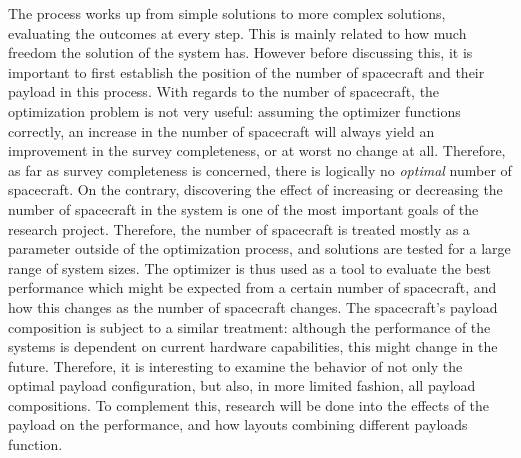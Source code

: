 The process works up from simple solutions to more complex solutions, evaluating the outcomes at every step. This is mainly related to how much freedom the solution of the system has. However before discussing this, it is important to first establish the position of the number of spacecraft and their payload in this process. With regards to the number of spacecraft, the optimization problem is not very useful: assuming the optimizer functions correctly, an increase in the number of spacecraft will always yield an improvement in the survey completeness, or at worst no change at all. Therefore, as far as survey completeness is concerned, there is logically no \textit{optimal} number of spacecraft. On the contrary, discovering the effect of increasing or decreasing the number of spacecraft in the system is one of the most important goals of the research project. Therefore, the number of spacecraft is treated mostly as a parameter outside of the optimization process, and solutions are tested for a large range of system sizes. The optimizer is thus used as a tool to evaluate the best performance which might be expected from a certain number of spacecraft, and how this changes as the number of spacecraft changes. The spacecraft's payload composition is subject to a similar treatment: although the performance of the systems is dependent on current hardware capabilities, this might change in the future. Therefore, it is interesting to examine the behavior of not only the optimal payload configuration, but also, in more limited fashion, all payload compositions. To complement this, research will be done into the effects of the payload on the performance, and how layouts combining different payloads function.\\

